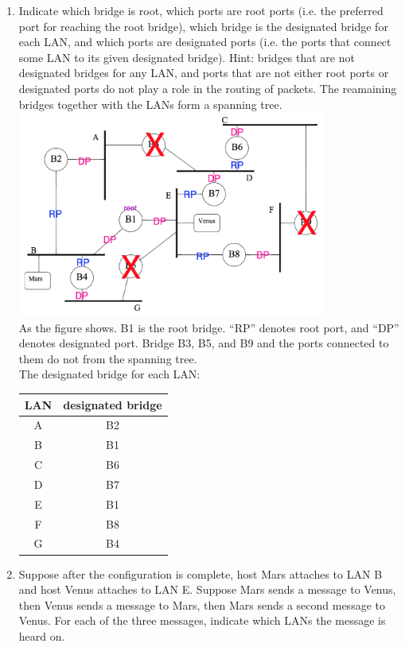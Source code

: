 \documentclass[10pt, a4paper]{article}
\begin{document}
\begin{enumerate}
\begin{enumerate}
        \item Indicate which bridge is root, which ports are root ports (i.e. the preferred port for reaching the root bridge), which bridge is the designated bridge for each LAN, and which ports are designated ports (i.e. the ports that connect some LAN to its given designated bridge). Hint: bridges that are not designated bridges for any LAN, and ports that are not either root ports or designated ports do not play a role in the routing of packets. The reamaining bridges together with the LANs form a spanning tree.\\
            \color{blue}
            \includegraphics[width=4in]{images/p6a_spanning_tree_result}\\
            As the figure shows. B1 is the root bridge. ``RP'' denotes root port, and ``DP'' denotes designated port. Bridge B3, B5, and B9 and the ports connected to them do not from the spanning tree.\\
            The designated bridge for each LAN:\\
            \begin{tabular}{cc}
                \toprule
                LAN & designated bridge\\
                \hline
                A & B2\\
                B & B1\\
                C & B6\\
                D & B7\\
                E & B1\\
                F & B8\\
                G & B4\\
                \bottomrule
            \end{tabular}
            \color{black}
        \item Suppose after the configuration is complete, host Mars attaches to LAN B and host Venus attaches to LAN E. Suppose Mars sends a message to Venus, then Venus sends a message to Mars, then Mars sends a second message to Venus. For each of the three messages, indicate which LANs the message is heard on.

\end{enumerate}
\end{enumerate}
\end{document}
